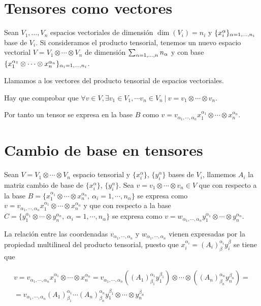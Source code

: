 \section{Tensores como vectores}\label{sec:tensores-como-vectores}
Sean $V_1,\ldots,V_n$ espacios vectoriales de dimensión $\dim(V_i)=n_i$ y
$\{x_i^\alpha\}_{\alpha=1,\ldots,n_i}$ base de $V_i$.
Si consideramos el producto tensorial, tenemos un nuevo espacio vectorial $V=V_1\otimes\cdots\otimes V_n$
de dimensión $\sum_{\alpha=1,\ldots,n} n_\alpha$ y con base
$\{x_1^{\alpha_1}\otimes\cdots\otimes x_n^{\alpha_n}\}_{\alpha_i=1,\ldots,n_i}$.

\begin{definition}
  Llamamos  a los vectores del producto tensorial de espacios vectoriales.
\end{definition}

\begin{remark}
  Hay que comprobar que $\forall v\in V, \exists v_1\in V_1, \cdots v_n\in V_n\ |\ v=v_1\otimes\cdots\otimes v_n$.
\end{remark}

Por tanto un tensor se expresa en la base $B$ como $v=v_{\alpha_1,\cdots,\alpha_n} x_1^{\alpha_1}\otimes\cdots\otimes x_n^{\alpha_n}$.

\section{Cambio de base en tensores}\label{sec:cambio-de-base-en-tensores}
Sean $V=V_1\otimes\cdots\otimes V_n$ espacio tensorial y $\{x_i^\alpha\}$, $\{y_i^\alpha\}$ bases de $V_i$, llamemos $A_i$
la matriz cambio de base de $\{x_i^\alpha\}$, $\{y_i^\alpha\}$.
Sea $v=v_1\otimes\cdots\otimes v_n \in V$ que con respecto a la base
$B=\{x_1^{\alpha_1}\otimes\cdots\otimes x_n^{\alpha_n},\ \alpha_i=1,\cdots,n_\alpha \}$
se expresa como $v=v_{\alpha_1,\cdots,\alpha_n} x_1^{\alpha_1}\otimes\cdots\otimes x_n^{\alpha_n}$ y
que con respecto a la base $C=\{y_1^{\alpha_1}\otimes\cdots\otimes y_n^{\alpha_n},\ \alpha_i=1,\cdots,n_\alpha \}$
se expresa como $v=w_{\alpha_1,\cdots,\alpha_n} y_1^{\alpha_1}\otimes\cdots\otimes y_n^{\alpha_n}$.

La relación entre las coordenadas $v_{\alpha_1,\cdots,\alpha_n}$ y $w_{\alpha_1,\cdots,\alpha_n}$
vienen expresadas por la propiedad multilineal del producto tensorial, puesto
que $x_i^{\alpha_i}=(A_i)^{\alpha_i}_\beta y_i^{\beta}$ se tiene que

\begin{multline*}
  v=v_{\alpha_1,\cdots,\alpha_n} x_1^{\alpha_1}\otimes\cdots\otimes x_n^{\alpha_n}=
  v_{\alpha_1,\cdots,\alpha_n} ((A_1)^{\alpha_1}_{\beta_1}y_1^{\beta_1})\otimes\cdots\otimes ((A_n)^{\alpha_n}_{\beta_n}y_n^{\beta_n})=\\
  =v_{\alpha_1,\cdots,\alpha_n}(A_1)^{\alpha_1}_{\beta_1}\cdots (A_n)^{\alpha_n}_{\beta_n} y_1^{\beta_1}\otimes\cdots\otimes y_n^{\beta_n}
\end{multline*}

